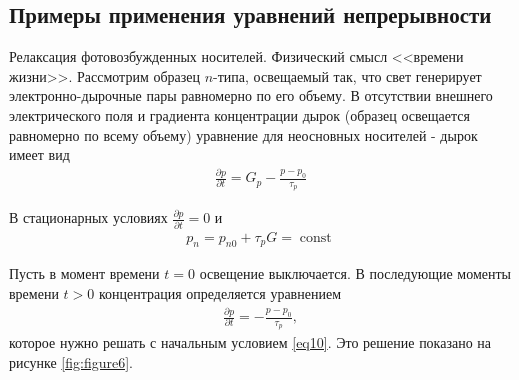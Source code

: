 \documentclass[a4paper,14pt]{extarticle}
\DeclareMathOperator{\const}{const}
\begin{document}




\subsection{Примеры применения уравнений непрерывности}

Релаксация фотовозбужденных носителей. Физический смысл <<времени жизни>>. Рассмотрим образец $n$-типа, освещаемый так, что свет генерирует электронно-дырочные пары равномерно по его объему. В отсутствии внешнего электрического поля и градиента концентрации дырок (образец освещается равномерно по всему объему) уравнение  для неосновных носителей - дырок имеет вид %
\begin{gather}
	\label{eq9}
	\frac{\partial p}{\partial t}=G_{p}-\frac{p-p_{0}}{\tau_{p}}
\end{gather}

В стационарных условиях $\frac{\partial p}{\partial t}=0$ и
\begin{gather}
	\label{eq10}
	p_{n}=p_{n 0}+\tau_{p} G=\const
\end{gather}

Пусть в момент времени $t = 0$ освещение выключается. В последующие моменты времени $t > 0$ концентрация определяется уравнением
\begin{gather}
	\label{eq11}
	\frac{\partial p}{\partial t}=-\frac{p-p_{0}}{\tau_{p}},
\end{gather}
которое нужно решать с начальным условием \eqref{eq10}. Это решение показано на рисунке \ref{fig:figure6}.
\end{document}
